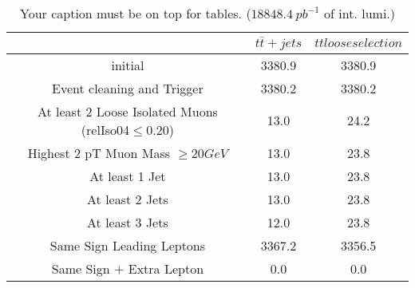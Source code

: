 \documentclass{article}
\begin{document}
\begin{table}
\caption{Your caption must be on top for tables. ($18848.4~pb^{-1}$ of int. lumi.)}
\label{tab:}
\centering
\begin{tabular}{|c|cc|}
\toprule
&$t\bar{t}+jets$	&$tt loose selection$	\\

\midrule
initial&	3380.9	&3380.9	\\

Event cleaning and Trigger&	3380.2	&3380.2	\\

At least 2 Loose Isolated Muons (relIso04$\leq 0.20$)&	13.0	&24.2	\\

Highest 2 pT Muon Mass $\geq 20 GeV$&	13.0	&23.8	\\

At least 1  Jet&	13.0	&23.8	\\

At least 2 Jets&	13.0	&23.8	\\

At least 3 Jets&	12.0	&23.8	\\

Same Sign Leading Leptons&	3367.2	&3356.5	\\

Same Sign $+$ Extra Lepton&	0.0	&0.0	\\

\bottomrule
\end{tabular}
\end{table}
\end{document}
